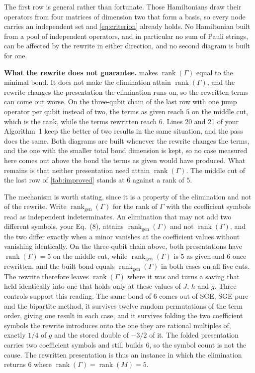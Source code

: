 \documentclass[11pt,a4paper]{article}
\newcommand{\rank}{\operatorname{rank}}
\begin{document}
The first row is general rather than fortunate. Those Hamiltonians draw their operators from four
matrices of dimension two that form a basis, so every node carries an independent set and
\cref{eq:criterion} already holds. No Hamiltonian built from a pool of independent operators, and in
particular no sum of Pauli strings, can be affected by the rewrite in either direction, and no second
diagram is built for one.

\textbf{What the rewrite does not guarantee.}  makes $\rank(\Gamma)$ equal to the
minimal bond. It does not make the elimination attain $\rank(\Gamma)$, and the rewrite changes the
presentation the elimination runs on, so the rewritten terms can come out worse. On the three-qubit
chain of the last row with one jump operator per qubit instead of two, the terms as given reach $5$
on the middle cut, which is the rank, while the terms rewritten reach $6$. Lines 20 and 21 of your
Algorithm~1 keep the better of two results in the same situation, and the pass does the same. Both
diagrams are built whenever the rewrite changes the terms, and the one with the smaller total bond
dimension is kept, so no case measured here comes out above the bond the terms as given would have
produced. What remains is that neither presentation need attain $\rank(\Gamma)$. The middle cut of
the last row of \cref{tab:improved} stands at $6$ against a rank of $5$.

The mechanism is worth stating, since it is a property of the elimination and not of the rewrite.
Write $\rank_{\mathrm{gen}}(\Gamma)$ for the rank of $\Gamma$ with the coefficient symbols read as
independent indeterminates. An elimination that may not add two different symbols, your Eq.~(8),
attains $\rank_{\mathrm{gen}}(\Gamma)$ and not $\rank(\Gamma)$, and the two differ exactly when a
minor vanishes at the coefficient values without vanishing identically. On the three-qubit chain
above, both presentations have $\rank(\Gamma) = 5$ on the middle cut, while
$\rank_{\mathrm{gen}}(\Gamma)$ is $5$ as given and $6$ once rewritten, and the built bond equals
$\rank_{\mathrm{gen}}(\Gamma)$ in both cases on all five cuts. The rewrite therefore leaves
$\rank(\Gamma)$ where it was and turns a saving that held identically into one that holds only at
these values of $J$, $h$ and $g$. Three controls support this reading. The same bond of $6$ comes
out of SGE, SGE-pure and the bipartite method, it survives twelve random permutations of the term
order, giving one result in each case, and it survives folding the two coefficient symbols the
rewrite introduces onto the one they are rational multiples of, exactly $1/4$ of $g$ and the stored
double of $-3/2$ of it. The folded presentation carries two coefficient symbols and still builds
$6$, so the symbol count is not the cause. The rewritten presentation is thus an instance in which
the elimination returns $6$ where $\rank(\Gamma) = \rank(M) = 5$.
\end{document}
